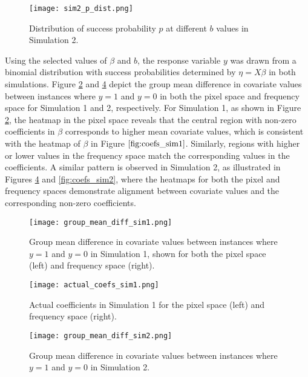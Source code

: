 \documentclass[12pt]{article}
\begin{document}
\begin{figure}[htbp] 
	\centering
	\texttt{[image: sim2\_p\_dist.png]} 
  \caption{Distribution of success probability \( p \) at different \( b \) values in Simulation 2.}
	\label{fig:sim2_p_dist} 
\end{figure}

Using the selected values of \( \beta \) and \( b \), the response variable \( y \) was drawn from a binomial distribution with
success probabilities determined by \( \eta = X \beta \) in both simulations. Figure \ref{fig:group_diff1} and
\ref{fig:group_diff2} depict the group mean difference in covariate values between instances where \( y = 1 \) and \( y = 0
\) in both the pixel space and frequency space for Simulation 1 and 2, respectively. For Simulation 1, as shown in Figure \ref{fig:group_diff1}, the heatmap in the pixel space reveals that the central
region with non-zero coefficients in \( \beta \) corresponds to higher mean covariate values, which is consistent with
the heatmap of \( \beta \) in Figure \( \ref{fig:coefs_sim1} \). Similarly, regions with higher or lower values in the
frequency space match the corresponding values in the coefficients. A similar pattern is observed in Simulation 2, as illustrated in Figures \ref{fig:group_diff2} and \ref{fig:coefs_sim2},
where the heatmaps for both the pixel and frequency spaces demonstrate alignment between covariate values and the
corresponding non-zero coefficients. 

\begin{figure}[htbp] 
	\centering
	\texttt{[image: group\_mean\_diff\_sim1.png]}
	\caption{Group mean difference in covariate values between instances where \( y = 1 \) and \( y = 0 \) in Simulation
  1, shown for both the pixel space (left) and frequency space (right).}
	\label{fig:group_diff1}
\end{figure}

\begin{figure}[htbp] 
	\centering
	\texttt{[image: actual\_coefs\_sim1.png]}
  \caption{Actual coefficients in Simulation 1 for the pixel space (left) and frequency space (right).}
  \label{fig:coefs_sim1}
\end{figure}

\begin{figure}[htbp] 
	\centering
	\texttt{[image: group\_mean\_diff\_sim2.png]}
	\caption{Group mean difference in covariate values between instances where \( y = 1 \) and \( y = 0 \) in Simulation 2.}
	\label{fig:group_diff2}
\end{figure}
\end{document}
